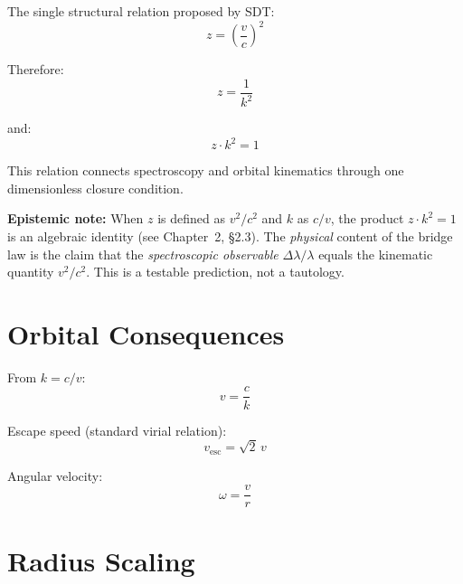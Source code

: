 The single structural relation proposed by SDT:
\begin{equation}\label{eq:bridge}
  z = \left(\frac{v}{c}\right)^2
\end{equation}

Therefore:
\begin{equation}\label{eq:z-from-k}
  z = \frac{1}{k^2}
\end{equation}

and:
\begin{equation}\label{eq:closure}
  \boxed{z \cdot k^2 = 1}
\end{equation}

This relation connects spectroscopy and orbital kinematics through one dimensionless closure condition.

\textbf{Epistemic note:} When $z$ is defined as $v^2/c^2$ and $k$ as $c/v$, the product $z \cdot k^2 = 1$ is an algebraic identity (see Chapter~2, \S2.3).  The \emph{physical} content of the bridge law is the claim that the \emph{spectroscopic observable} $\Delta\lambda/\lambda$ equals the kinematic quantity $v^2/c^2$.  This is a testable prediction, not a tautology.


\section{Orbital Consequences}
\label{sec:orbital}

From $k = c/v$:
\begin{equation}\label{eq:v-from-k}
  v = \frac{c}{k}
\end{equation}

Escape speed (standard virial relation):
\begin{equation}\label{eq:vesc}
  v_{\text{esc}} = \sqrt{2}\,v
\end{equation}

Angular velocity:
\begin{equation}\label{eq:omega}
  \omega = \frac{v}{r}
\end{equation}


\section{Radius Scaling}
\label{sec:radius-scaling}

